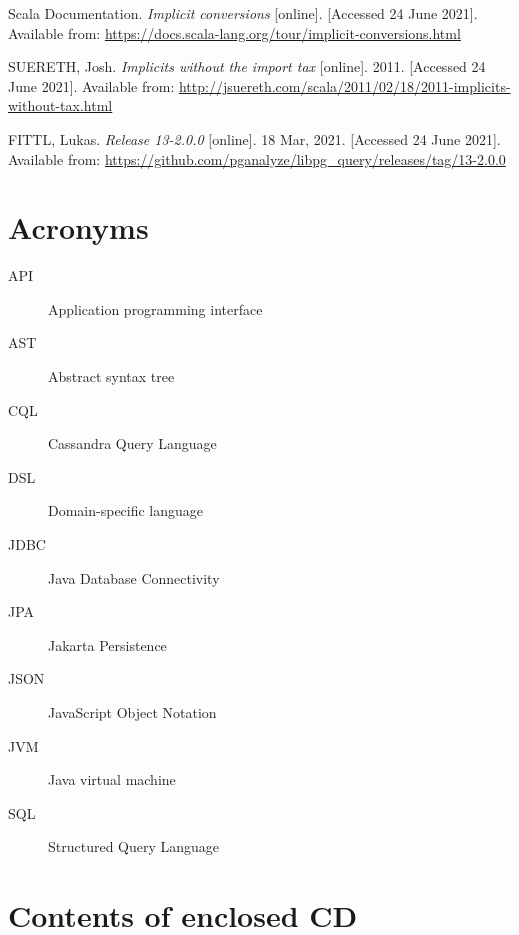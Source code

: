 \documentclass[thesis=B,english]{FITthesis}[2019/12/23]
\begin{document}
\begin{thebibliography}{9}
Scala Documentation.
\textit {Implicit conversions} [online]. [Accessed 24 June 2021]. Available from:
\url{https://docs.scala-lang.org/tour/implicit-conversions.html}

SUERETH, Josh.
\textit {Implicits without the import tax} [online]. 2011. [Accessed 24 June 2021]. Available from: \url{http://jsuereth.com/scala/2011/02/18/2011-implicits-without-tax.html}

FITTL, Lukas.
\textit {Release 13-2.0.0} [online]. 18 Mar, 2021. [Accessed 24 June 2021]. Available from:
\url{https://github.com/pganalyze/libpg\_query/releases/tag/13-2.0.0}

\end{thebibliography}
\appendix

\chapter{Acronyms}
\begin{description}
	\item[API] Application programming interface
	\item[AST] Abstract syntax tree
	\item[CQL] Cassandra Query Language
	\item[DSL] Domain-specific language
	\item[JDBC] Java Database Connectivity
	\item[JPA] Jakarta Persistence
	\item[JSON] JavaScript Object Notation
	\item[JVM] Java virtual machine
	\item[SQL] Structured Query Language
\end{description}


\chapter{Contents of enclosed CD}


\begin{figure}
\end{figure}
\end{document}
